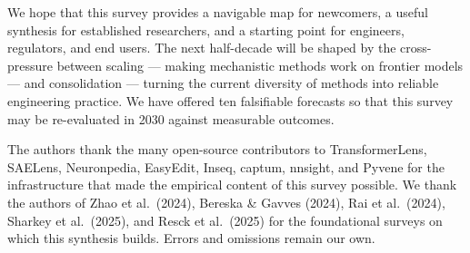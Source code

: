 \documentclass{article}
\begin{document}
We hope that this survey provides a navigable map for newcomers, a useful synthesis for established researchers, and a starting point for engineers, regulators, and end users. The next half-decade will be shaped by the cross-pressure between scaling --- making mechanistic methods work on frontier models --- and consolidation --- turning the current diversity of methods into reliable engineering practice. We have offered ten falsifiable forecasts so that this survey may be re-evaluated in 2030 against measurable outcomes.

The authors thank the many open-source contributors to TransformerLens, SAELens, Neuronpedia, EasyEdit, Inseq, captum, nnsight, and Pyvene for the infrastructure that made the empirical content of this survey possible. We thank the authors of Zhao et al.~(2024), Bereska \& Gavves (2024), Rai et al.~(2024), Sharkey et al.~(2025), and Resck et al.~(2025) for the foundational surveys on which this synthesis builds. Errors and omissions remain our own.



\end{document}
